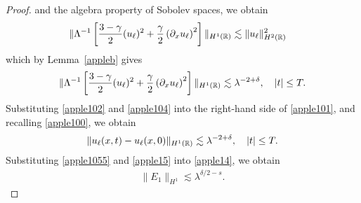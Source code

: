\begin{proof}
%
%
and the algebra property of Sobolev spaces, we obtain
%
%
\begin{equation*}
\begin{split}
\|\Lambda^{-1} \left[ \frac{3-\gamma}{2}(u_\ell)^2 +
\frac{\gamma}{2}\left( \partial_x u_\ell \right)^2 \right] \|_{H^1(\mathbb{R})}
& \lesssim \|u_\ell\|_{H^2(\mathbb{R})}^2
\end{split}
\end{equation*}
%
%
which by Lemma~\ref{appleb} gives
%
%
\begin{equation}
\begin{split}
\|\Lambda^{-1} \left[ \frac{3-\gamma}{2}(u_\ell)^2 +
\frac{\gamma}{2}\left( \partial_x u_\ell \right)^2 \right] \|_{H^1(\mathbb{R})}
\lesssim \lambda^{-2 + \delta}, \quad |t| \le T.
\label{apple104}
\end{split}
\end{equation}
%
%
Substituting \eqref{apple102} and \eqref{apple104} into the right-hand side 
of
\eqref{apple101}, and recalling \eqref{apple100}, we obtain
%
%
\begin{equation}
\begin{split}
\|u_\ell(x,t) - u_\ell(x,0)\|_{H^1(\mathbb{R})} \lesssim \lambda^{-2 + \delta}, 
\quad |t| \le T.
\label{apple1055}
\end{split}
\end{equation}
%
Substituting \eqref{apple1055} and \eqref{apple15} into \eqref{apple14}, we obtain
%
%
\begin{equation}
  \label{apple105}
\begin{split}
  \| E_{1} \|_{H^{1}} \lesssim \lambda^{\delta/2 -s}.
\end{split}
\end{equation}
%
%

\end{proof}
